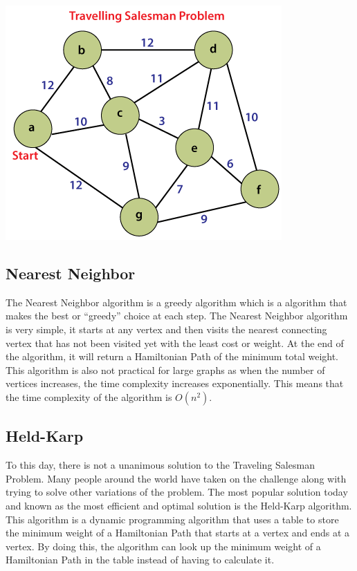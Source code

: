 \documentclass[12pt]{article}
\begin{document}
\begin{center}
    \includegraphics[scale = .5]{images/graph3.png}
\end{center}

\subsection{Nearest Neighbor}
The Nearest Neighbor algorithm is a greedy algorithm which is a algorithm
that makes the best or ``greedy'' choice at each step. The Nearest Neighbor algorithm is very simple, it starts at any vertex and then visits the nearest connecting vertex that has
not been visited yet with the least cost or weight. At the end of the algorithm, it will return a Hamiltonian Path of the minimum total weight. This algorithm is also not practical for large graphs as when the number of vertices increases, the time complexity increases exponentially. This means that the time complexity of the algorithm is $O(n^2)$.

\subsection{Held-Karp}
To this day, there is not a unanimous solution to the Traveling Salesman Problem. Many people around the world have taken on the challenge along with trying to solve other variations of the problem. The most popular solution today and known as the most efficient and optimal solution is the Held-Karp algorithm. This algorithm is a dynamic programming algorithm that uses a table to store the minimum weight of a Hamiltonian Path that starts at a vertex and ends at a vertex. By doing this, the algorithm can look up the minimum weight of a Hamiltonian Path in the table instead of having to calculate it. 
\end{document}
